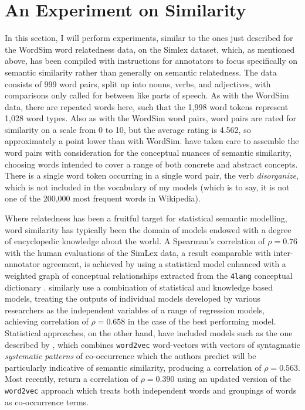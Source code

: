 \section{An Experiment on Similarity} \label{sec:simperiment}
In this section, I will perform experiments, similar to the ones just described for the WordSim word relatedness data, on the Simlex dataset, which, as mentioned above, has been compiled with instructions for annotators to focus specifically on semantic similarity rather than generally on semantic relatedness.  The data consists of 999 word pairs, split up into nouns, verbs, and adjectives, with comparisons only called for between like parts of speech.  As with the WordSim data, there are repeated words here, such that the 1,998 word tokens represent 1,028 word types.  Also as with the WordSim word pairs, word pairs are rated for similarity on a scale from 0 to 10, but the average rating is 4.562, so approximately a point lower than with WordSim.  \cite{HillEA2015} have taken care to assemble the word pairs with consideration for the conceptual nuances of semantic similarity, choosing words intended to cover a range of both concrete and abstract concepts.  There is a single word token occurring in a single word pair, the verb \emph{disorganize}, which is not included in the vocabulary of my models (which is to say, it is not one of the 200,000 most frequent words in Wikipedia).

Where relatedness has been a fruitful target for statistical semantic modelling, word similarity has typically been the domain of models endowed with a degree of encyclopedic knowledge about the world.  A Spearman's correlation of $\rho = 0.76$ with the human evaluations of the SimLex data, a result comparable with inter-annotator agreement, is achieved by \cite{RecskiEA2016} using a statistical model enhanced with a weighted graph of conceptual relationships extracted from the \texttt{4lang} conceptual dictionary \citep{KornaiEA2015}.  \cite{BanjadeEA2015} similarly use a combination of statistical and knowledge based models, treating the outputs of individual models developed by various researchers as the independent variables of a range of regression models, achieving correlation of $\rho = 0.658$ in the case of the best performing model.  Statistical approaches, on the other hand, have included models such as the one described by \cite{SchwartzEA2015}, which combines \texttt{word2vec} word-vectors with vectors of syntagmatic \emph{systematic patterns} of co-occurrence which the authors predict will be particularly indicative of semantic similarity, producing a correlation of $\rho = 0.563$.  Most recently, \cite{MaEA2017} return a correlation of $\rho = 0.390$ using an updated version of the \texttt{word2vec} approach which treats both independent words and groupings of words as co-occurrence terms.

